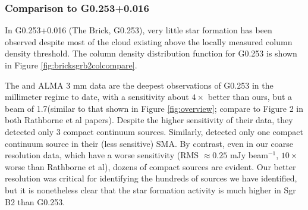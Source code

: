 \documentclass[twocolumn]{aastex61}
\begin{document}


\subsubsection{Comparison to G0.253+0.016}
In G0.253+0.016 (The Brick, G0.253), very little star formation
has been observed
\citep{Longmore2013a,Johnston2014a,Rathborne2014a,Rathborne2015a} despite most
of the cloud existing above the locally measured \citet{Lada2010a} column
density threshold.  The column density distribution function for G0.253
is shown in Figure \ref{fig:bricksgrb2colcompare}.

The \citet{Rathborne2014a} and \citet{Rathborne2015a} ALMA 3 mm data are the
deepest observations of G0.253 in the millimeter regime to date, with a
sensitivity about $4\times$ better than ours, but a beam of 1.7\arcsec (similar
to that shown in Figure \ref{fig:overview}; compare to Figure 2 in both
Rathborne et al papers).  Despite the higher sensitivity of their data,
they detected only 3 compact continuum sources.  Similarly,
\citet{Kauffmann2013a} detected only one compact continuum source in their
(less sensitive) SMA.  By contrast, even in our coarse resolution data, which
have a worse sensitivity (RMS $\approx 0.25$ mJy beam$^{-1}$, $10\times$ worse
than Rathborne et al), dozens of compact sources are evident.  Our better
resolution was critical for identifying the hundreds of sources we have
identified, but it is nonetheless clear that the star formation activity is
much higher in Sgr B2 than G0.253.
\end{document}
